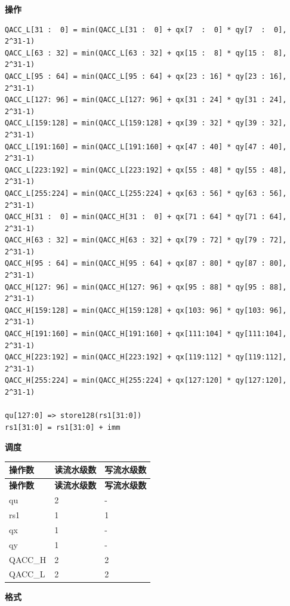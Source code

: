 \textbf{操作}\\

\begin{lstlisting}
QACC_L[31 :  0] = min(QACC_L[31 :  0] + qx[7  :  0] * qy[7  :  0], 2^31-1)
QACC_L[63 : 32] = min(QACC_L[63 : 32] + qx[15 :  8] * qy[15 :  8], 2^31-1)
QACC_L[95 : 64] = min(QACC_L[95 : 64] + qx[23 : 16] * qy[23 : 16], 2^31-1)
QACC_L[127: 96] = min(QACC_L[127: 96] + qx[31 : 24] * qy[31 : 24], 2^31-1)
QACC_L[159:128] = min(QACC_L[159:128] + qx[39 : 32] * qy[39 : 32], 2^31-1)
QACC_L[191:160] = min(QACC_L[191:160] + qx[47 : 40] * qy[47 : 40], 2^31-1)
QACC_L[223:192] = min(QACC_L[223:192] + qx[55 : 48] * qy[55 : 48], 2^31-1)
QACC_L[255:224] = min(QACC_L[255:224] + qx[63 : 56] * qy[63 : 56], 2^31-1)
QACC_H[31 :  0] = min(QACC_H[31 :  0] + qx[71 : 64] * qy[71 : 64], 2^31-1)
QACC_H[63 : 32] = min(QACC_H[63 : 32] + qx[79 : 72] * qy[79 : 72], 2^31-1)
QACC_H[95 : 64] = min(QACC_H[95 : 64] + qx[87 : 80] * qy[87 : 80], 2^31-1)
QACC_H[127: 96] = min(QACC_H[127: 96] + qx[95 : 88] * qy[95 : 88], 2^31-1)
QACC_H[159:128] = min(QACC_H[159:128] + qx[103: 96] * qy[103: 96], 2^31-1)
QACC_H[191:160] = min(QACC_H[191:160] + qx[111:104] * qy[111:104], 2^31-1)
QACC_H[223:192] = min(QACC_H[223:192] + qx[119:112] * qy[119:112], 2^31-1)
QACC_H[255:224] = min(QACC_H[255:224] + qx[127:120] * qy[127:120], 2^31-1)

qu[127:0] => store128(rs1[31:0])
rs1[31:0] = rs1[31:0] + imm
\end{lstlisting}

\textbf{调度}\\
\begin{longtable}[c]{|l|l|l|}
    \hline
    \rowcolor{lightgray}
    \textbf{操作数} & \textbf{读流水级数} & \textbf{写流水级数} \\\hline
    \endfirsthead
    \hline
    \rowcolor{lightgray}
     \textbf{操作数} & \textbf{读流水级数} & \textbf{写流水级数} \\\hline
    \endhead
    \hline
    \endfoot

    qu & 2 & - \\\hline
    rs1 & 1 & 1 \\\hline
     qx & 1 & - \\\hline
     qy & 1 & - \\\hline
     QACC\_H & 2 & 2 \\\hline
     QACC\_L & 2 & 2

\end{longtable}

\textbf{格式}\\

